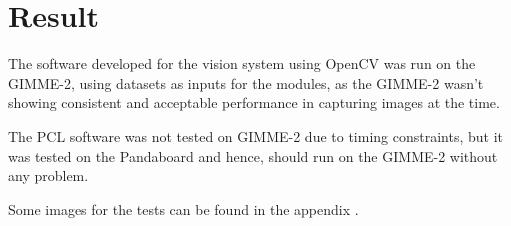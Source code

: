 \section{Result}\label{sec:result}
The software developed for the vision system using OpenCV was run on the GIMME-2, using datasets as inputs for the modules, as the GIMME-2 wasn't showing consistent and acceptable performance in capturing images at the time. 

The PCL software was not tested on GIMME-2 due to timing constraints, but it was tested on the Pandaboard and hence, should run on the GIMME-2 without any problem.

Some images for the tests can be found in the appendix \label{vision_appendix_A} .